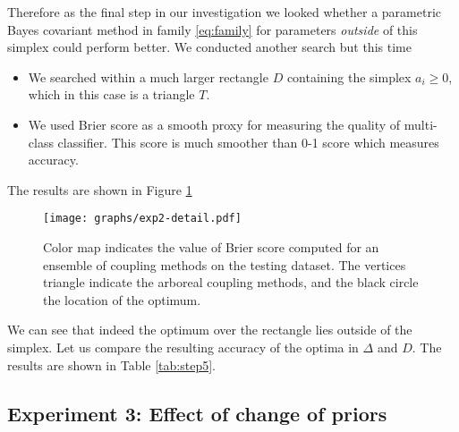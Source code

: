 \documentclass[twoside,11pt]{article}
\begin{document}
Therefore as the final step in our investigation we looked whether a parametric Bayes covariant method in family \eqref{eq:family} for parameters \emph{outside} of this simplex could perform better. We conducted another search but this time
\begin{itemize}
	\item We searched within a much larger rectangle $D$ containing the simplex $a_i\geq 0$, which in this case is a triangle $T$.
	\item We used Brier score as a smooth proxy for measuring the quality of multi-class classifier. This score is much smoother than 0-1 score which measures accuracy.
\end{itemize}

The results are shown in Figure \ref{fig:score}


\begin{figure}[!ht]
	\texttt{[image: graphs/exp2-detail.pdf]}
	\caption{Color map indicates the value of Brier score computed for an ensemble of coupling methods on the testing dataset. The vertices triangle indicate the arboreal coupling methods, and the black circle the location of the optimum.}
	\label{fig:score}
\end{figure}

We can see that indeed the optimum over the rectangle lies outside of the simplex. Let us compare the resulting accuracy of the optima in $\Delta$ and $D$. The results are shown in Table \ref{tab:step5}.



\subsection{Experiment 3: Effect of change of priors}  \label{sec:exp3}




%

\end{document}
